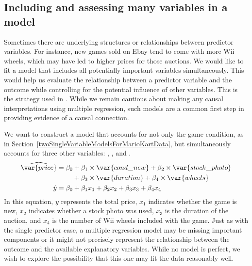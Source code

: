 \subsection{Including and assessing many variables in a model}
\label{includingAndAssessingManyVariablesInAModel}

Sometimes there are underlying structures or relationships between predictor variables. For instance, new games sold on Ebay tend to come with more Wii wheels, which may have led to higher prices for those auctions. We would like to fit a model that includes all potentially important variables simultaneously. This would help us evaluate the relationship between a predictor variable and the outcome while controlling for the potential influence of other variables. This is the strategy used in . While we remain cautious about making any causal interpretations using multiple regression, such models are a common first step in providing evidence of a causal connection.

We want to construct a model that accounts for not only the game condition, as in Section~\ref{twoSingleVariableModelsForMarioKartData}, but simultaneously accounts for three other variables: , , and .
\begin{align}
\widehat{\var{price}}
	&= \beta_0 + \beta_1\times \var{cond\_\hspace{0.3mm}new} +
		\beta_2\times \var{stock\_\hspace{0.3mm}photo} \notag \\
	&\qquad\  + \beta_3 \times  \var{duration} +
		\beta_4 \times  \var{wheels} \notag \\
\hat{y}
	&= \beta_0 + \beta_1 x_1 + \beta_2 x_2 +
		\beta_3 x_3 + \beta_4 x_4
\label{eqForMultipleRegrOfTotalPrForAllPredictors}
\end{align}
In this equation, $y$ represents the total price, $x_1$ indicates whether the game is new, $x_2$ indicates whether a stock photo was used, $x_3$ is the duration of the auction, and $x_4$ is the number of Wii wheels included with the game. Just as with the single predictor case, a multiple regression model may be missing important components or it might not precisely represent the relationship between the outcome and the available explanatory variables. While no model is perfect, we wish to explore the possibility that this one may fit the data reasonably well.

